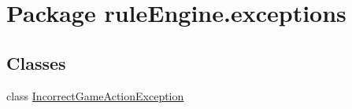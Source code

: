 \hypertarget{namespacerule_engine_1_1exceptions}{}\section{Package rule\+Engine.\+exceptions}
\label{namespacerule_engine_1_1exceptions}
\subsection*{Classes}
\begin{DoxyCompactItemize}
\item 
class \mbox{\hyperlink{classrule_engine_1_1exceptions_1_1_incorrect_game_action_exception}{Incorrect\+Game\+Action\+Exception}}
\end{DoxyCompactItemize}

